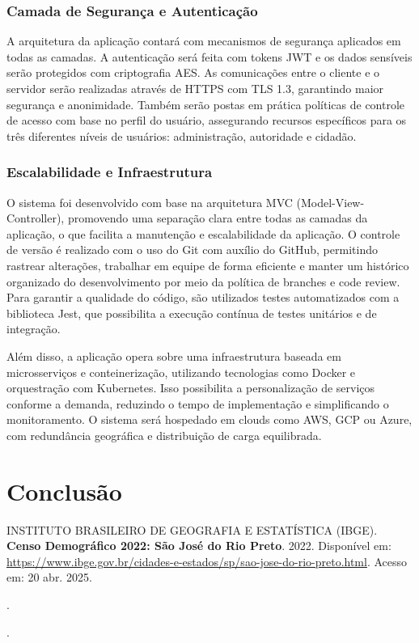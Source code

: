 \documentclass[a5paper, 12pt]{article}
\begin{document}
\subsubsection{Camada de Segurança e Autenticação}

A arquitetura da aplicação contará com mecanismos de segurança aplicados em todas as camadas. A autenticação será feita com tokens JWT e os dados sensíveis serão protegidos com criptografia AES. As comunicações entre o cliente e o servidor serão realizadas através de HTTPS com TLS 1.3, garantindo maior segurança e anonimidade. Também serão postas em prática políticas de controle de acesso com base no perfil do usuário, assegurando recursos específicos para os três diferentes níveis de usuários: administração, autoridade e cidadão.

\subsubsection{Escalabilidade e Infraestrutura}

O sistema foi desenvolvido com base na arquitetura MVC (Model-View-Controller), promovendo uma separação clara entre todas as camadas da aplicação, o que facilita a manutenção e escalabilidade da aplicação. O controle de versão é realizado com o uso do Git com auxílio do GitHub, permitindo rastrear alterações, trabalhar em equipe de forma eficiente e manter um histórico organizado do desenvolvimento por meio da política de branches e code review. Para garantir a qualidade do código, são utilizados testes automatizados com a biblioteca Jest, que possibilita a execução contínua de testes unitários e de integração. 
\par Além disso, a aplicação opera sobre uma infraestrutura baseada em microsserviços e conteinerização, utilizando tecnologias como Docker e orquestração com Kubernetes. Isso possibilita a personalização de serviços conforme a demanda, reduzindo o tempo de implementação e simplificando o monitoramento. O sistema será hospedado em clouds como AWS, GCP ou Azure, com redundância geográfica e distribuição de carga equilibrada.

\newpage
\section{Conclusão}

\newpage
\renewcommand{\refname}{Bibliografia}
\begin{thebibliography}{09}
 INSTITUTO BRASILEIRO DE GEOGRAFIA E ESTATÍSTICA (IBGE). 
\textbf{Censo Demográfico 2022: São José do Rio Preto}. 
2022. 
Disponível em: \url{https://www.ibge.gov.br/cidades-e-estados/sp/sao-jose-do-rio-preto.html}. 
Acesso em: 20 abr. 2025.

\bibitem{} %
\textbf{}. %

\bibitem{} %
\textbf{}. %

\end{thebibliography}
\end{document}
